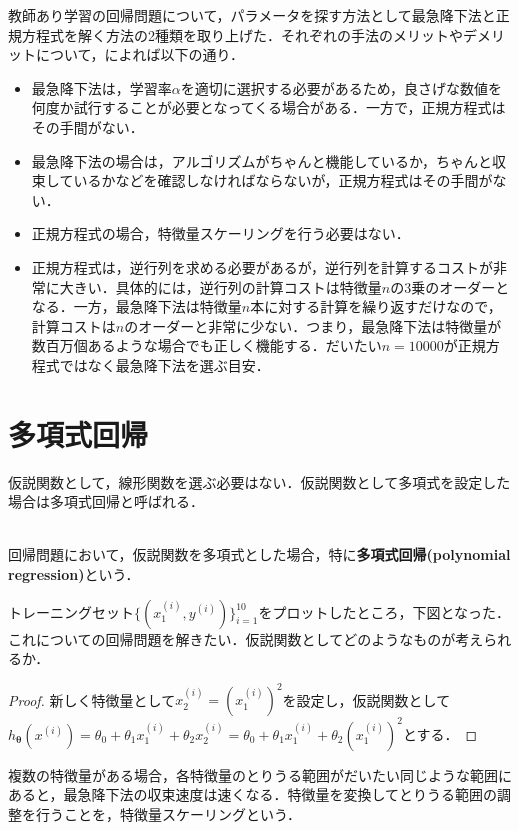 教師あり学習の回帰問題について，パラメータを探す方法として最急降下法と正規方程式を解く方法の2種類を取り上げた．それぞれの手法のメリットやデメリットについて，\cite{AndrewML}によれば以下の通り．
\begin{itemize}
\item 最急降下法は，学習率$\alpha $を適切に選択する必要があるため，良さげな数値を何度か試行することが必要となってくる場合がある．一方で，正規方程式はその手間がない．
\item 最急降下法の場合は，アルゴリズムがちゃんと機能しているか，ちゃんと収束しているかなどを確認しなければならないが，正規方程式はその手間がない．
\item 正規方程式の場合，特徴量スケーリングを行う必要はない．
\item 正規方程式は，逆行列を求める必要があるが，逆行列を計算するコストが非常に大きい．具体的には，逆行列の計算コストは特徴量$n$の3乗のオーダーとなる．一方，最急降下法は特徴量$n$本に対する計算を繰り返すだけなので，計算コストは$n$のオーダーと非常に少ない．つまり，最急降下法は特徴量が数百万個あるような場合でも正しく機能する．だいたい$n=10000$が正規方程式ではなく最急降下法を選ぶ目安．
\end{itemize}

\section{多項式回帰}

仮説関数として，線形関数を選ぶ必要はない．仮説関数として多項式を設定した場合は多項式回帰と呼ばれる．
\begin{defi}[多項式回帰]
　\\
回帰問題において，仮説関数を多項式とした場合，特に{\bf 多項式回帰(polynomial regression)}という．
\end{defi}

\begin{qu}
トレーニングセット$\{(x_1^{(i)},y^{(i)})\}_{i=1}^10$をプロットしたところ，下図となった．これについての回帰問題を解きたい．仮説関数としてどのようなものが考えられるか．

\end{qu}
\begin{proof}
新しく特徴量として$x_2^{(i)}=(x_1^{(i)})^2$を設定し，仮説関数として$h_{{\bm \theta}}(x^{(i)})=\theta_0+\theta_1 x_1^{(i)}+\theta_2 x_2^{(i)}=\theta_0+\theta_1 x_1^{(i)}+\theta_2 (x_1^{(i)})^2$とする．
\end{proof}

複数の特徴量がある場合，各特徴量のとりうる範囲がだいたい同じような範囲にあると，最急降下法の収束速度は速くなる．特徴量を変換してとりうる範囲の調整を行うことを，特徴量スケーリングという．

